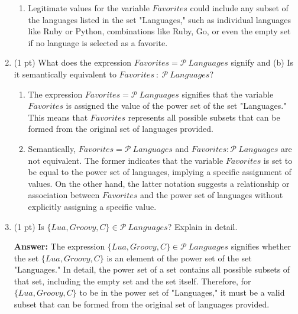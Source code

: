 \documentclass[12pt]{article}
\begin{document}
\begin{spacing}{1.5}
\begin{enumerate}
\begin{enumerate}
		      	\item Legitimate values for the variable $Favorites$ could include any subset of the languages listed in the set "Languages," such as individual languages like Ruby or Python, combinations like {Ruby, Go}, or even the empty set if no language is selected as a favorite.
		      \end{enumerate}
		      		      		      		      
		\item (1 pt) What does the expression $Favorites = \mathcal{P} \: Languages$ signify and (b) Is it semantically equivalent to $Favorites \: : \: \mathcal{P} \: Languages$?
		      		      		      		      
		      \begin{enumerate}
		      	\item The expression $Favorites = \mathcal{P} \: Languages$ signifies that the variable $Favorites$ is assigned the value of the power set of the set "Languages." This means that $Favorites$ represents all possible subsets that can be formed from the original set of languages provided. 

		      	\item Semantically, $Favorites = \mathcal{P} \: Languages$ and $Favorites : \mathcal{P} \: Languages$ are not equivalent. The former indicates that the variable $Favorites$ is set to be equal to the power set of languages, implying a specific assignment of values. On the other hand, the latter notation suggests a relationship or association between $Favorites$ and the power set of languages without explicitly assigning a specific value.\\
		      \end{enumerate}
		      		      		      		                  
		\item (1 pt) Is $\{Lua, Groovy, C\} \in \mathcal{P} \: Languages$? Explain in detail.
		      		      		      		      
		      \textbf{Answer:} The expression $\{Lua, Groovy, C\} \in \mathcal{P} \: Languages$ signifies whether the set $\{Lua, Groovy, C\}$ is an element of the power set of the set "Languages." In detail, the power set of a set contains all possible subsets of that set, including the empty set and the set itself. Therefore, for $\{Lua, Groovy, C\}$ to be in the power set of "Languages," it must be a valid subset that can be formed from the original set of languages provided.\\
		      		      		      		                  

\end{enumerate}
\end{spacing}
\end{document}
